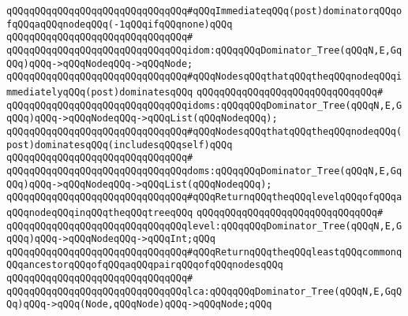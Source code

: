 \newline
\newline
\verb|qQQqqQQqqQQqqQQqqQQqqQQqqQQqqQQq#qQQqImmediateqQQq(post)dominatorqQQqofqQQqaqQQqnodeqQQq(-1qQQqifqQQqnone)qQQq|\newline
\verb|qQQqqQQqqQQqqQQqqQQqqQQqqQQqqQQq#|\newline
\verb|qQQqqQQqqQQqqQQqqQQqqQQqqQQqqQQqidom:qQQqqQQqDominator_Tree(qQQqN,E,GqQQq)qQQq->qQQqNodeqQQq->qQQqNode;|\newline
\newline
\newline
\verb|qQQqqQQqqQQqqQQqqQQqqQQqqQQqqQQq#qQQqNodesqQQqthatqQQqtheqQQqnodeqQQqimmediatelyqQQq(post)dominatesqQQq|\newline
\verb|qQQqqQQqqQQqqQQqqQQqqQQqqQQqqQQq#|\newline
\verb|qQQqqQQqqQQqqQQqqQQqqQQqqQQqqQQqidoms:qQQqqQQqDominator_Tree(qQQqN,E,GqQQq)qQQq->qQQqNodeqQQq->qQQqList(qQQqNodeqQQq);|\newline
\newline
\newline
\verb|qQQqqQQqqQQqqQQqqQQqqQQqqQQqqQQq#qQQqNodesqQQqthatqQQqtheqQQqnodeqQQq(post)dominatesqQQq(includesqQQqself)qQQq|\newline
\verb|qQQqqQQqqQQqqQQqqQQqqQQqqQQqqQQq#|\newline
\verb|qQQqqQQqqQQqqQQqqQQqqQQqqQQqqQQqdoms:qQQqqQQqDominator_Tree(qQQqN,E,GqQQq)qQQq->qQQqNodeqQQq->qQQqList(qQQqNodeqQQq);|\newline
\newline
\newline
\verb|qQQqqQQqqQQqqQQqqQQqqQQqqQQqqQQq#qQQqReturnqQQqtheqQQqlevelqQQqofqQQqaqQQqnodeqQQqinqQQqtheqQQqtreeqQQq|\newline
\verb|qQQqqQQqqQQqqQQqqQQqqQQqqQQqqQQq#|\newline
\verb|qQQqqQQqqQQqqQQqqQQqqQQqqQQqqQQqlevel:qQQqqQQqDominator_Tree(qQQqN,E,GqQQq)qQQq->qQQqNodeqQQq->qQQqInt;qQQq|\newline
\newline
\verb|qQQqqQQqqQQqqQQqqQQqqQQqqQQqqQQq#qQQqReturnqQQqtheqQQqleastqQQqcommonqQQqancestorqQQqofqQQqaqQQqpairqQQqofqQQqnodesqQQq|\newline
\verb|qQQqqQQqqQQqqQQqqQQqqQQqqQQqqQQq#|\newline
\verb|qQQqqQQqqQQqqQQqqQQqqQQqqQQqqQQqlca:qQQqqQQqDominator_Tree(qQQqN,E,GqQQq)qQQq->qQQq(Node,qQQqNode)qQQq->qQQqNode;qQQq|\newline
\newline
